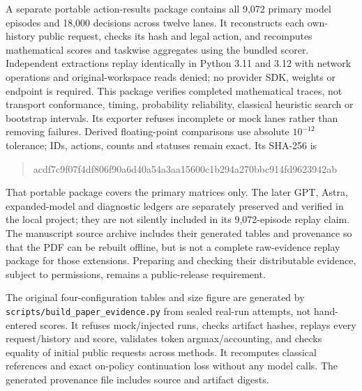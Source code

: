 \documentclass[11pt]{article}
\begin{document}
A separate portable action-results package contains all 9,072 primary model
episodes and 18,000 decisions across twelve lanes. It reconstructs each
own-history public request, checks its hash and legal action, and recomputes
mathematical scores and taskwise aggregates using the bundled scorer.
Independent extractions replay identically in Python 3.11 and 3.12 with
network operations and original-workspace reads denied; no provider SDK,
weights or endpoint is required. This package verifies completed mathematical
traces, not transport conformance, timing, probability reliability, classical
heuristic search or bootstrap intervals. Its exporter refuses incomplete or
mock lanes rather than removing failures. Derived floating-point comparisons
use absolute $10^{-12}$ tolerance; IDs, actions, counts and statuses remain
exact. Its SHA-256 is
\begin{quote}\footnotesize\ttfamily
acdf7c9f07f4df806f90a6d40a54a3aa15600c1b294a270bbc914fd9623942ab
\end{quote}

That portable package covers the primary matrices only. The later GPT,
Astra, expanded-model and diagnostic ledgers are separately preserved and
verified in the local project; they are not silently included in its
9,072-episode replay claim. The manuscript source archive includes their
generated tables and provenance so that the PDF can be rebuilt offline,
but is not a complete raw-evidence replay package for those extensions.
Preparing and checking their distributable evidence, subject to permissions,
remains a public-release requirement.

The original four-configuration tables and size figure are generated by
\texttt{scripts/build\_paper\_evidence.py} from sealed real-run attempts, not
hand-entered scores. It refuses mock/injected runs, checks artifact hashes,
replays every request/history and score, validates token argmax/accounting,
and checks equality of initial public requests across methods. It recomputes
classical references and exact on-policy continuation loss without any model
calls. The generated provenance file includes source and artifact digests.
\end{document}
